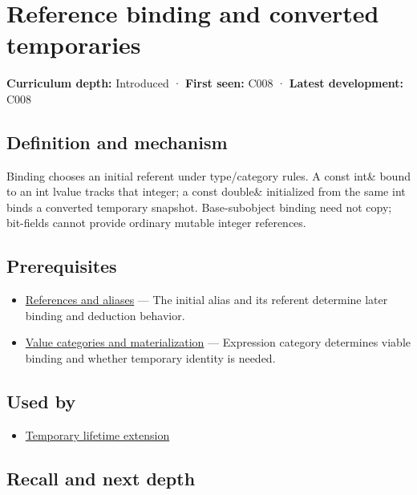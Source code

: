 \hypertarget{appendix-37856d997bb0}{}\label{referencestart:appendix-37856d997bb0}
\section{Reference binding and converted temporaries}\label{appendix-37856d997bb0-reference-binding-and-converted-temporaries}

\textbf{Curriculum depth:} Introduced · \textbf{First seen:} C008 · \textbf{Latest development:} C008

\subsection{Definition and mechanism}\label{appendix-37856d997bb0-definition-and-mechanism}

Binding chooses an initial referent under type/category rules. A const int\& bound to an int lvalue tracks that integer; a const double\& initialized from the same int binds a converted temporary snapshot. Base-subobject binding need not copy; bit-fields cannot provide ordinary mutable integer references.

\subsection{Prerequisites}\label{appendix-37856d997bb0-prerequisites}

\begin{itemize}
\tightlist
\item
  \hyperref[appendix-d6d562ca9fbb]{References and aliases} --- The initial alias and its referent determine later binding and deduction behavior.
\item
  \hyperref[appendix-1121b30eaeb0]{Value categories and materialization} --- Expression category determines viable binding and whether temporary identity is needed.
\end{itemize}

\subsection{Used by}\label{appendix-37856d997bb0-used-by}

\begin{itemize}
\tightlist
\item
  \hyperref[appendix-a978b29bbbb0]{Temporary lifetime extension}
\end{itemize}

\subsection{Recall and next depth}\label{appendix-37856d997bb0-recall-and-next-depth}

